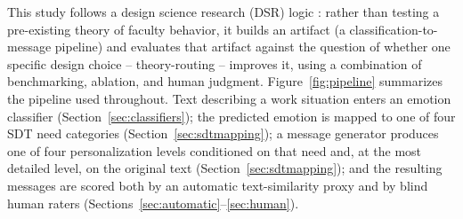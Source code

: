 \documentclass[higheredu,article,submit,pdftex,moreauthors]{Definitions/mdpi}
\begin{document}
This study follows a design science research (DSR) logic \cite{hevner2004}: rather than testing a pre-existing theory of faculty behavior, it builds an artifact (a classification-to-message pipeline) and evaluates that artifact against the question of whether one specific design choice -- theory-routing -- improves it, using a combination of benchmarking, ablation, and human judgment. Figure~\ref{fig:pipeline} summarizes the pipeline used throughout. Text describing a work situation enters an emotion classifier (Section~\ref{sec:classifiers}); the predicted emotion is mapped to one of four SDT need categories (Section~\ref{sec:sdtmapping}); a message generator produces one of four personalization levels conditioned on that need and, at the most detailed level, on the original text (Section~\ref{sec:sdtmapping}); and the resulting messages are scored both by an automatic text-similarity proxy and by blind human raters (Sections~\ref{sec:automatic}--\ref{sec:human}).
\end{document}
